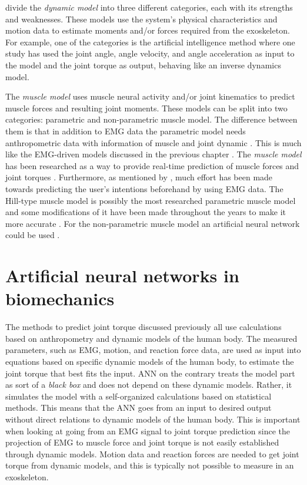 \documentclass[../main.tex]{subfiles}
\begin{document}
\textcite{Anam2012} divide the \textit{dynamic model} into three different categories, each with its strengths and weaknesses.
These models use the system's physical characteristics and motion data to estimate moments and/or forces required from the exoskeleton. 
For example, one of the categories is the artificial intelligence method where one study has used the joint angle, angle velocity, and angle acceleration as input to the model and the joint torque as output, behaving like an inverse dynamics model.

The \textit{muscle model} uses muscle neural activity and/or joint kinematics to predict muscle forces and resulting joint moments. 
These models can be split into two categories: parametric and non-parametric muscle model. 
The difference between them is that in addition to \ac{EMG} data the parametric model needs anthropometric data with information of muscle and joint dynamic \cite{Anam2012}.
This is much like the \ac{EMG}-driven models discussed in the previous chapter \cite{Pizzolato2015}.
The \textit{muscle model} has been researched as a way to provide real-time prediction of muscle forces and joint torques \cite{Pizzolato2015, Anam2012, durandau}. 
Furthermore, as mentioned by \textcite{Anam2012}, much effort has been made towards predicting the user's intentions beforehand by using \ac{EMG} data.
The Hill-type muscle model is possibly the most researched parametric muscle model and some modifications of it have been made throughout the years to make it more accurate \cite{Pizzolato2015, Lloyd2003, Anam2012, Lee14-1}.
For the non-parametric muscle model an artificial neural network could be used \cite{Lee14-1, Kiguchi2012}.  

\section{Artificial neural networks in biomechanics}
The methods to predict joint torque discussed previously all use calculations based on anthropometry and dynamic models of the human body. 
The measured parameters, such as \ac{EMG}, motion, and reaction force data, are used as input into equations based on specific dynamic models of the human body, to estimate the joint torque that best fits the input.
\ac{ANN} on the contrary treats the model part as sort of a \textit{black box} and does not depend on these dynamic models. 
Rather, it simulates the model with a self-organized calculations based on statistical methods.
This means that the \ac{ANN} goes from an input to desired output without direct relations to dynamic models of the human body.
This is important when looking at going from an \ac{EMG} signal to joint torque prediction since the projection of \ac{EMG} to muscle force and joint torque is not easily established through dynamic models.
Motion data and reaction forces are needed to get joint torque from dynamic models, and this is typically not possible to measure in an exoskeleton.
\end{document}
